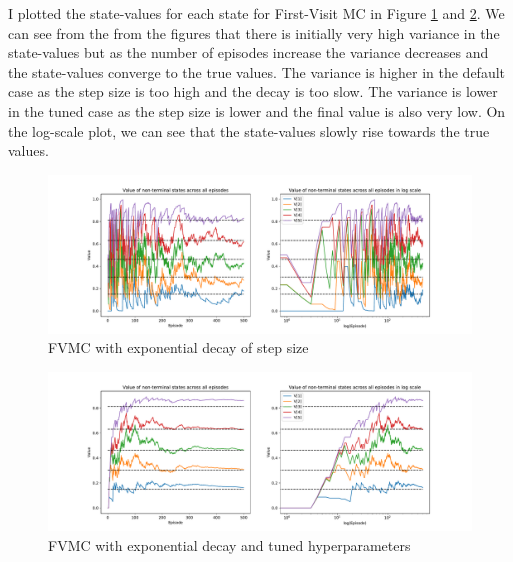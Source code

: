 \begin{enumerate}
    I plotted the state-values for each state for First-Visit MC in Figure \ref{fig:default_fvmc} and \ref{fig:tuned_fvmc}. We can see from the from the figures that there is initially very high variance in the state-values but as the number of episodes increase the variance decreases and the state-values converge to the true values. The variance is higher in the default case as the step size is too high and the decay is too slow. The variance is lower in the tuned case as the step size is lower and the final value is also very low. On the log-scale plot, we can see that the state-values slowly rise towards the true values.

    \begin{figure}[h]
        \centering
        \includegraphics[width=\textwidth]{images/mc_td/first_visit_exponential_0.5_0.01_episode_values.pdf}
        \caption{FVMC with exponential decay of step size}
        \label{fig:default_fvmc}
    \end{figure}

    \begin{figure}[h]
        \centering
        \includegraphics[width=\textwidth]{images/mc_td/first_visit_exponential_0.1_0.0008_episode_values.pdf}
        \caption{FVMC with exponential decay and tuned hyperparameters}
        \label{fig:tuned_fvmc}
    \end{figure}


\end{enumerate}

